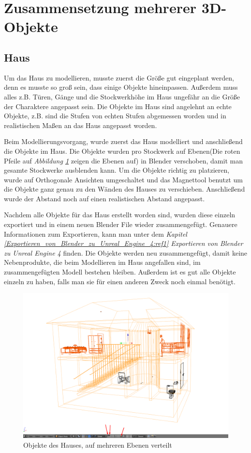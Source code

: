 \section{Zusammensetzung mehrerer 3D-Objekte}
\subsection{Haus}
\label{haus:ref1}
Um das Haus zu modellieren, musste zuerst die Größe gut eingeplant werden, denn es musste so groß sein, dass einige Objekte hineinpassen.
Außerdem muss alles z.B. Türen, Gänge und die Stockwerkhöhe im Haus ungefähr an die Größe der Charaktere angepasst sein.
Die Objekte im Haus sind angelehnt an echte Objekte, z.B. sind die Stufen von echten Stufen abgemessen worden und in realistischen Maßen an das Haus angepasst worden.

Beim Modellierungsvorgang, wurde zuerst das Haus modelliert und anschließend die Objekte im Haus. Die Objekte wurden pro Stockwerk auf Ebenen(Die roten Pfeile auf \textit{Abbildung \ref{Haus:image1}} zeigen
die Ebenen auf) in Blender verschoben, damit man gesamte Stockwerke ausblenden kann. Um die Objekte richtig zu platzieren, wurde auf Orthogonale Ansichten umgeschaltet
und das Magnettool benutzt um die Objekte ganz genau zu den Wänden des Hauses zu verschieben. Anschließend wurde der Abstand noch auf einen realistischen Abstand angepasst.

Nachdem alle Objekte für das Haus erstellt worden sind, wurden diese einzeln exportiert und in einem neuen Blender File wieder zusammengefügt. Genauere Informationen zum Exportieren, kann
man unter dem \textit{Kapitel \ref{Exportieren_von_Blender_zu_Unreal_Engine_4:ref1} \dq Exportieren von Blender zu Unreal Engine 4\dq} finden. Die Objekte werden neu zusammengefügt, damit keine Nebenprodukte, die beim Modellieren
im Haus angefallen sind, im zusammengefügten Modell bestehen bleiben. Außerdem ist es gut alle Objekte einzeln zu haben, falls man sie für einen anderen Zweck noch einmal benötigt.

\begin{figure}[h]
    \centering
    \includegraphics[width=.8\textwidth]{images/Haus-zusammenfuegen_Ebenen.png}
    \caption{Objekte des Hauses, auf mehreren Ebenen verteilt}
    \label{Haus:image1}
\end{figure}
